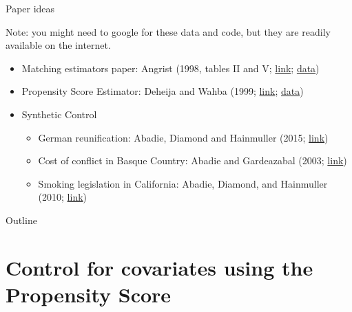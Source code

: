 \documentclass[compress, 8pt]{beamer}
\begin{document}
\begin{frame}{Paper ideas}

Note: you might need to google for these data and code, but they are readily available on the internet. 
\begin{itemize}

    \item Matching estimators paper: Angrist (1998, tables II and V;
\href{https://www.jstor.org/stable/2998558}{link}; \href{https://economics.mit.edu/people/faculty/josh-angrist/angrist-data-archive}{data})

    \item Propensity Score Estimator: Deheija and Wahba (1999; \href{https://www.jstor.org/stable/pdf/2669919.pdf}{link}; \href{https://users.nber.org/~rdehejia/nswdata2.html}{data})

    \item Synthetic Control
    \begin{itemize}
        \item German reunification: Abadie, Diamond and Hainmuller (2015; \href{https://onlinelibrary.wiley.com/doi/abs/10.1111/ajps.12116}{link})
        \item Cost of conflict in Basque Country: Abadie and Gardeazabal (2003; \href{https://www.aeaweb.org/articles?id=10.1257/000282803321455188}{link})
        \item Smoking legislation in California: Abadie, Diamond, and Hainmuller (2010; \href{https://www.tandfonline.com/doi/abs/10.1198/jasa.2009.ap08746}{link})
    \end{itemize}
\end{itemize}

\end{frame}


\miniframesoff
\begin{frame}{Outline}
    \tableofcontents
\end{frame}
\miniframeson



\section[Propensity Score]{Control for covariates using the Propensity Score}
\miniframesoff
\begin{frame}
    \tableofcontents[currentsection]
\end{frame}
\miniframeson
\end{document}
